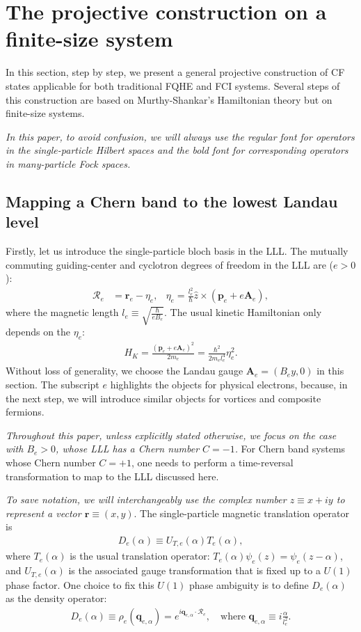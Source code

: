 \section{The projective construction on a finite-size system}\label{sec:M_S_finite}
In this section, step by step, we present a general projective construction of CF states applicable for both traditional FQHE and FCI systems. Several steps of this construction are based on Murthy-Shankar's Hamiltonian theory but on finite-size systems. 

\emph{In this paper, to avoid confusion, we will always use the regular font for operators in the single-particle Hilbert spaces and the bold font for corresponding operators in many-particle Fock spaces.}

\subsection{Mapping a Chern band to the lowest Landau level}
Firstly, let us introduce the single-particle bloch basis in the LLL. The mutually commuting guiding-center and cyclotron degrees of freedom in the LLL are ($e>0$):
\begin{align}
\mathcal R_e&=\bm r_e-\eta_e, & \eta_e=\frac{l_e^2}{\hbar}\hat z\times (\mathbf p_e+e\mathbf A_e),
\end{align}
where the magnetic length $l_e\equiv \sqrt{\frac{\hbar}{eB_e}}$. The usual kinetic Hamiltonian only depends on the $\eta_e$:
\begin{align}
H_K= \frac{(\mathbf p_e+e\mathbf A_e)^2}{2m_e}=\frac{\hbar^2}{2m_e l_e^4}\eta_e^2.
\end{align}
Without loss of generality, we choose the Landau gauge $\mathbf A_e=(B_e y,0)$ in this section. The subscript $e$ highlights the objects for physical electrons, because, in the next step, we will introduce similar objects for vortices and composite fermions.

\emph{Throughout this paper, unless explicitly stated otherwise, we focus on the case with $B_e>0$, whose LLL has a Chern number $C=-1$.} For Chern band systems whose Chern number $C=+1$, one needs to perform a time-reversal transformation to map to the LLL discussed here.

\emph{To save notation, we will interchangeably use the complex number $z\equiv x+iy$ to represent a vector $\bm r\equiv(x,y)$}. The single-particle magnetic translation operator is
\begin{align}
D_e(\alpha)\equiv U_{T,e}(\alpha)T_e(\alpha),
\end{align}
where $T_e(\alpha)$ is the usual translation operator: $T_e(\alpha)\psi_e(z)=\psi_e(z-\alpha)$, and $U_{T,e}(\alpha)$ is the associated gauge transformation that is fixed up to a $U(1)$ phase factor. One choice to fix this $U(1)$ phase ambiguity is to define $D_e(\alpha)$ as the density operator:
\begin{align}
D_e(\alpha)\equiv\rho_e(\mathbf q_{e, \alpha})=e^{i \mathbf q_{e, \alpha} \cdot \mathcal R_e}, \quad\text{where }\mathbf q_{e, \alpha}\equiv i\frac{\alpha}{l_e^2}.\label{eq:real_momentum}
\end{align}

